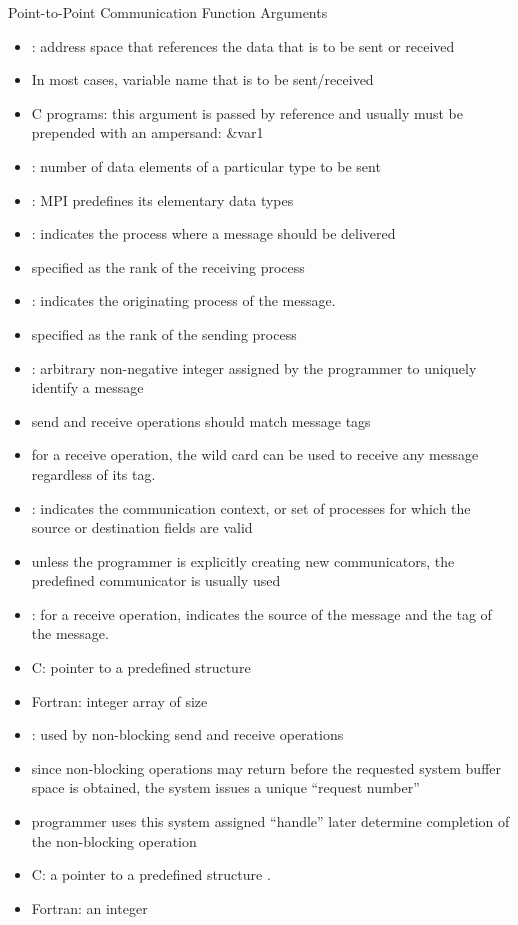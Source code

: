 \documentclass[10pt,t]{beamer}
\begin{document}
\begin{frame}{Point-to-Point Communication Function Arguments}
  \begin{itemize}
    \item {}: address space that references the data that is to be sent or received
    \item[] In most cases, variable name that is to be sent/received
    \item[] C programs: this argument is passed by reference and usually must be prepended with an ampersand: \&var1
    \item {}: number of data elements of a particular type to be sent
    \item {}: MPI predefines its elementary data types
    \item {}: indicates the process where a message should be delivered
    \item[] specified as the rank of the receiving process
    \item {}: indicates the originating process of the message.
      \item[] specified as the rank of the sending process
    \item {}: arbitrary non-negative integer assigned by the programmer to uniquely identify a message
    \item[] send and receive operations should match message tags
    \item[] for a receive operation, the wild card  can be used to receive any message regardless of its tag.
    \item {}: indicates the communication context, or set of processes for which the source or destination fields are valid 
    \item[] unless the programmer is explicitly creating new communicators, the predefined communicator  is usually used
    \item {}: for a receive operation, indicates the source of the message and the tag of the message.
    \item[] C: pointer to a predefined structure 
    \item[] Fortran: integer array of size 
    \item {}: used by non-blocking send and receive operations
    \item[] since non-blocking operations may return before the requested system buffer space is obtained, the system issues a unique “request number”
    \item[] programmer uses this system assigned “handle” later determine completion of the non-blocking operation
    \item[] C: a pointer to a predefined structure .
    \item[] Fortran: an integer
  \end{itemize}
\end{frame}
\end{document}
